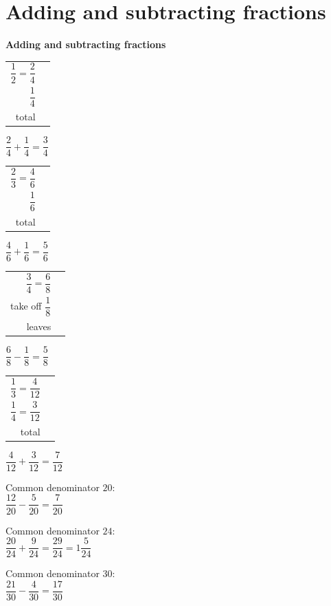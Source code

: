 \documentclass[aspectratio=169]{beamer}
\makeatletter
\newcommand{\qtopic}[1]{%
  \section{#1}%
  \begin{frame}[plain]
    \vfill
    \begin{center}
      {\usebeamercolor[fg]{structure}\Huge\bfseries #1}
    \end{center}
    \vfill
  \end{frame}%
}
\newcommand{\barstack}[1]{%
  {\renewcommand{\arraystretch}{1.2}%
   \begin{tabular}{@{}r@{\;\;}l@{}}#1\end{tabular}}%
}
\makeatother
\begin{document}
\qtopic{Adding and subtracting fractions}

  {\barstack{$\dfrac12=\dfrac24$ & \fbar{4}{2} \\[0.95em]
             $\dfrac14$ & \fbar{4}{1} \\[0.95em]
             total & \fbar{4}{3}}
   \par\vspace{0.5em}
   $\dfrac24+\dfrac14=\dfrac34$}

  {\barstack{$\dfrac23=\dfrac46$ & \fbar{6}{4} \\[0.95em]
             $\dfrac16$ & \fbar{6}{1} \\[0.95em]
             total & \fbar{6}{5}}
   \par\vspace{0.5em}
   $\dfrac46+\dfrac16=\dfrac56$}

  {\barstack{$\dfrac34=\dfrac68$ & \fbar{8}{6} \\[0.95em]
             take off $\dfrac18$ & \fbar{8}{1} \\[0.95em]
             leaves & \fbar{8}{5}}
   \par\vspace{0.5em}
   $\dfrac68-\dfrac18=\dfrac58$}

  {\barstack{$\dfrac13=\dfrac{4}{12}$ & \fbar{12}{4} \\[0.95em]
             $\dfrac14=\dfrac{3}{12}$ & \fbar{12}{3} \\[0.95em]
             total & \fbar{12}{7}}
   \par\vspace{0.5em}
   $\dfrac{4}{12}+\dfrac{3}{12}=\dfrac{7}{12}$}

  {Common denominator $20$:\\[0.4em]
   $\dfrac{12}{20}-\dfrac{5}{20}=\dfrac{7}{20}$}

  {Common denominator $24$:\\[0.4em]
   $\dfrac{20}{24}+\dfrac{9}{24}=\dfrac{29}{24}=1\dfrac{5}{24}$}

  {Common denominator $30$:\\[0.4em]
   $\dfrac{21}{30}-\dfrac{4}{30}=\dfrac{17}{30}$}
\end{document}
